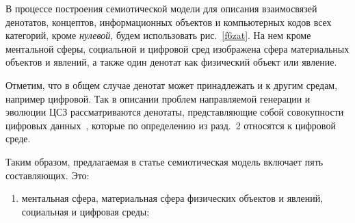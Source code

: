 \begin{multicols}{2}

   В процессе построения семиотической модели для описания взаимосвязей денотатов, 
концептов, информационных объектов и компьютерных кодов всех категорий, кроме 
\textit{нулевой}, будем использовать рис.~\ref{f6zat}. На нем кроме ментальной сферы, 
социальной и цифровой сред изображена сфера материальных объектов и явлений, а также 
один денотат как физический объект или явление.


   
   Отметим, что в общем случае денотат может принадлежать и к другим средам, например 
циф\-ро\-вой. Так в описании проблем направляемой генерации и эволюции ЦСЗ 
рассматриваются денотаты, представляющие собой совокупности циф\-ро\-вых 
данных~\cite{8zat, 9zat}, которые по определению из разд.~2 относятся к цифровой 
среде.
   
   Таким образом, предлагаемая в статье семиотическая модель включает пять 
составляющих. Это:

\noindent
   \begin{enumerate}[(1)]
\item ментальная сфера, материальная сфера физических объектов и явлений, 
социальная и циф\-ро\-вая среды;
\end{enumerate}

\end{multicols}

\begin{figure} %
\vspace*{1pt}
\begin{center}
\vspace*{1pt}
\mbox{%
\epsfxsize=138.729mm
}
\end{center}
\vspace*{-9pt}
\end{figure}


